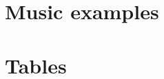 \documentclass[a4paper,12pt,twoside]{book}
\begin{document}
  \cleardoublepage

  \singlespacing
  \tableofcontents
  \doublespacing

  \appendix
  {\footnotesize
%
  \begin{appendices}
%
%
  \singlespacing
   \chapter{Music examples}
   \label{ln:appendix_examples}
%




    \chapter{Tables}

      
      
      
      

    


   \end{appendices}
}
\end{document}
